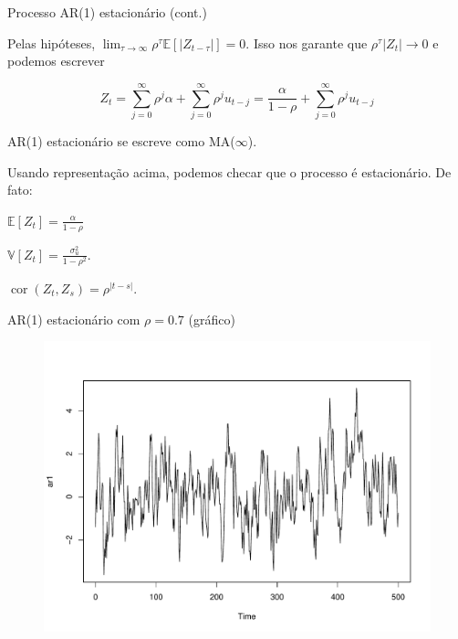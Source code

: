 \documentclass[11pt]{beamer}
\newenvironment{halfwideitemize}{\itemize\addtolength{\itemsep}{0.5em}}{\enditemize}
\newenvironment{halfwideenumerate}{\enumerate\addtolength{\itemsep}{0.5em}}{\endenumerate}
\begin{document}
\begin{frame}{Processo AR(1) estacionário (cont.)}
	\begin{halfwideitemize}
		\item Pelas hipóteses, $\lim_{\tau \to \infty} \rho^{\tau} \mathbb{E}[|Z_{t-\tau}|] = 0$. Isso nos garante que $\rho^{\tau} |Z_t| \to 0$ e podemos escrever
		
		$$Z_t = \sum_{j=0}^{\infty} \rho^{j} \alpha +   \sum_{j=0}^{\infty } \rho^{j} u_{t-j} = \frac{\alpha}{1-\rho} + \sum_{j=0}^\infty \rho^j u_{t-j}$$
		\item AR(1) estacionário se escreve como MA($\infty$).
		\item Usando representação acima, podemos checar que o processo é estacionário. De fato:
			\begin{halfwideenumerate}
			\item $\mathbb{E}[Z_t] = \frac{\alpha}{1-\rho}$
			\item $\mathbb{V}[Z_t] = \frac{\sigma^2_u}{1-\rho^2}$.
			\item $\operatorname{cor}(Z_t, Z_s) = \rho^{|t-s|}$.
		\end{halfwideenumerate}
	\end{halfwideitemize}
\end{frame}

\begin{frame}{AR(1) estacionário com $\rho = 0.7$ (gráfico)}
	\begin{figure}
		\includegraphics[scale=0.5]{graficos/ar1.pdf}
	\end{figure}
\end{frame}
\end{document}
